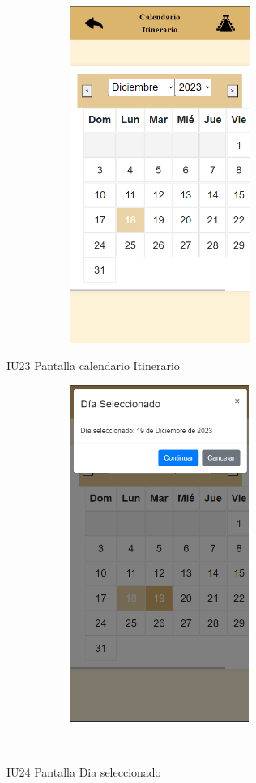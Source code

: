 \begin{figure}[htb]
    \begin{minipage}{1\textwidth}
    \centering
    \includegraphics[width=10cm, height=11cm]{entregable final/pantallasSistema/IU23 Pantalla calendario Itinerario.png}
    \caption{IU23 Pantalla calendario Itinerario}
\end{minipage}

    \begin{minipage}{1\textwidth}
        \centering
        \includegraphics[width=10cm, height=11cm]{entregable final/pantallasSistema/IU24 Pantalla Dia seleccionado.png}
        \caption{IU24 Pantalla Dia seleccionado}
    \end{minipage}
    \\
\end{figure}
